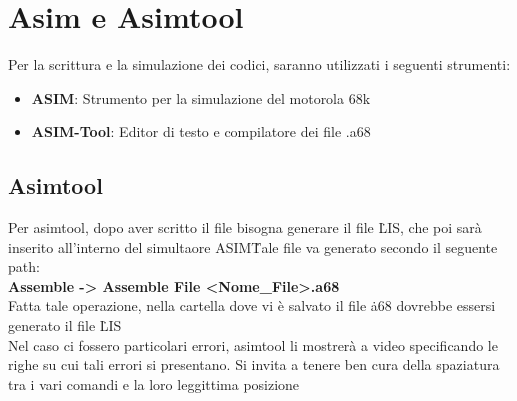 \section{Asim e Asimtool}
Per la scrittura e la simulazione dei codici, saranno utilizzati i seguenti strumenti:
\begin{itemize}
    \item \textbf{ASIM}: Strumento per la simulazione del motorola 68k
    \item \textbf{ASIM-Tool}: Editor di testo e compilatore dei file .a68
\end{itemize}

\subsection{Asimtool}

Per asimtool, dopo aver scritto il file bisogna generare il file \.LIS, che poi sarà inserito all'interno del simultaore ASIM\. Tale file va generato secondo il seguente path: 
\\
\textbf{Assemble -> Assemble File <Nome\_File>.a68}
\\
Fatta tale operazione, nella cartella dove vi è salvato il file \.a68 dovrebbe essersi generato il file \.LIS
\\
Nel caso ci fossero particolari errori, asimtool li mostrerà a video specificando le righe su cui tali errori si presentano. Si invita a tenere ben cura della spaziatura tra i vari comandi e la loro leggittima posizione


